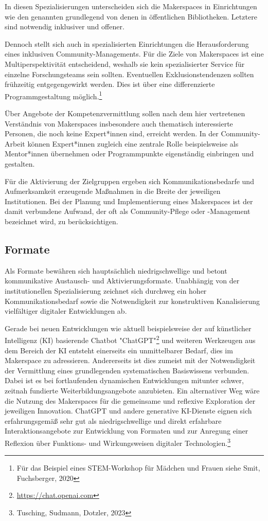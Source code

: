 \documentclass[a4paper,
fontsize=11pt,
oneside,
numbers=noperiodatend,
parskip=half-,
bibliography=totoc,
final
]{scrartcl}
\begin{document}
In diesen Spezialisierungen unterscheiden sich die Makerspaces in
Einrichtungen wie den genannten grundlegend von denen in öffentlichen
Bibliotheken. Letztere sind notwendig inklusiver und offener.

Dennoch stellt sich auch in spezialisierten Einrichtungen die
Herausforderung eines inklusiven Community-Managements. Für die Ziele
von Makerspaces ist eine Multiperspektivität entscheidend, weshalb sie
kein spezialisierter Service für einzelne Forschungsteams sein sollten.
Eventuellen Exklusionstendenzen sollten frühzeitig entgegengewirkt
werden. Dies ist über eine differenzierte Programmgestaltung
möglich.\footnote{Für das Beispiel eines STEM-Workshop für Mädchen und
  Frauen siehe Smit, Fuchsberger, 2020}

Über Angebote der Kompetenzvermittlung sollen nach dem hier vertretenen
Verständnis von Makerspaces insbesondere auch thematisch interessierte
Personen, die noch keine Expert*innen sind, erreicht werden. In der
Community-Arbeit können Expert*innen zugleich eine zentrale Rolle
beispielsweise als Mentor*innen übernehmen oder Programmpunkte
eigenständig einbringen und gestalten.

Für die Aktivierung der Zielgruppen ergeben sich Kommunikationsbedarfe
und Aufmerksamkeit erzeugende Maßnahmen in die Breite der jeweiligen
Institutionen. Bei der Planung und Implementierung eines Makerspaces ist
der damit verbundene Aufwand, der oft als Community-Pflege oder
-Management bezeichnet wird, zu berücksichtigen.

\hypertarget{formate}{%
\subsection{Formate}\label{formate}}

Als Formate bewähren sich hauptsächlich niedrigschwellige und betont
kommunikative Austausch- und Aktivierungsformate. Unabhängig von der
institutionellen Spezialisierung zeichnet sich durchweg ein hoher
Kommunikationsbedarf sowie die Notwendigkeit zur konstruktiven
Kanalisierung vielfältiger digitaler Entwicklungen ab.

Gerade bei neuen Entwicklungen wie aktuell beispielsweise der auf
künstlicher Intelligenz (KI) basierende Chatbot "Chat\-GPT"\footnote{\url{https://chat.openai.com}}
und weiteren Werkzeugen aus dem Bereich der KI entsteht einerseits ein
unmittelbarer Bedarf, dies im Makerspace zu adressieren. Andererseits
ist dies zumeist mit der Notwendigkeit der Vermittlung eines
grundlegenden systematischen Basiswissens verbunden. Dabei ist es bei
fortlaufenden dynamischen Entwicklungen mitunter schwer, zeitnah
fundierte Weiterbildungsangebote anzubieten. Ein alternativer Weg wäre
die Nutzung des Makerspaces für die gemeinsame und reflexive Exploration
der jeweiligen Innovation. Chat\-GPT und andere generative KI-Dienste
eignen sich erfahrungsgemäß sehr gut als niedrigschwellige und direkt
erfahrbare Interaktionsangebote zur Entwicklung von Formaten und zur
Anregung einer Reflexion über Funktions- und Wirkungsweisen digitaler
Technologien.\footnote{Tusching, Sudmann, Dotzler, 2023}
\end{document}
